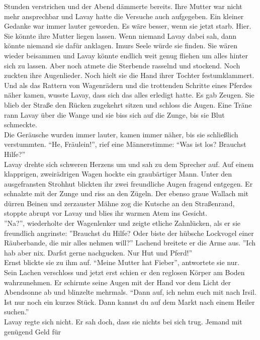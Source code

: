 Stunden verstrichen und der Abend dämmerte bereits. Ihre Mutter war nicht mehr ansprechbar und 
Lavay hatte die Versuche auch aufgegeben. Ein kleiner Gedanke war immer lauter geworden. Es 
wäre besser, wenn sie jetzt starb. Hier. Sie könnte ihre Mutter liegen lassen. Wenn niemand Lavay 
dabei sah, dann könnte niemand sie dafür anklagen. Imurs Seele würde sie finden. Sie wären wieder 
beisammen und Lavay könnte endlich weit genug fliehen um alles hinter sich zu lassen. Aber noch 
atmete die Sterbende rasselnd und stockend. Noch zuckten ihre Augenlieder. Noch hielt sie die Hand 
ihrer Tochter festumklammert.\\
Und als das Rattern von Wagenrädern und die trottenden Schritte eines Pferdes näher kamen, wusste 
Lavay, dass sich das alles erledigt hatte. Es gab Zeugen. Sie blieb der Straße den Rücken zugekehrt 
sitzen und schloss die Augen. Eine Träne rann Lavay über die Wange und sie biss sich auf die 
Zunge, bis sie Blut schmeckte.\\
Die Geräusche wurden immer lauter, kamen immer näher, bis sie schließlich verstummten. ``He, 
Fräulein!'', rief eine Männerstimme: ``Was ist los? Brauchst Hilfe?''\\
Lavay drehte sich schweren Herzens um und sah zu dem Sprecher auf. Auf einem klapprigen, 
zweirädrigen Wagen hockte ein graubärtiger Mann. Unter den ausgefransten Strohhut blickten ihr zwei 
freundliche Augen fragend entgegen. Er schnalzte mit der Zunge und riss an den Zügeln. Der 
ebenso graue Wallach mit dürren Beinen und zerzauster Mähne zog die Kutsche an den Straßenrand, 
stoppte abrupt vor Lavay und blies ihr warmen Atem ins Gesicht.\\
''Na?'', wiederholte der Wagenlenker und zeigte etliche Zahnlücken, als er sie freundlich 
angrinste: ''Brauchst du Hilfe? Oder biste der hübsche Lockvogel einer Räuberbande, die mir alles 
nehmen will?'' Lachend breitete er die Arme aus. ''Ich hab aber nix. Darfst gerne nachgucken. Nur 
Hut und Pferd!''\\
Ernst blickte sie zu ihm auf. ``Meine Mutter hat Fieber'', antwortete sie nur.\\
Sein Lachen verschloss und jetzt erst schien er den reglosen Körper am Boden wahrzunehmen. Er 
schirmte seine Augen mit der Hand vor dem Licht der Abendsonne ab und blinzelte mehrmals. ``Dann 
auf, ich nehm euch mit nach Irsil. Ist nur noch ein kurzes Stück. Dann kannst du auf dem Markt nach 
einem Heiler suchen.''\\
Lavay regte sich nicht. Er sah doch, dass sie nichts bei sich trug. Jemand mit genügend Geld für 
